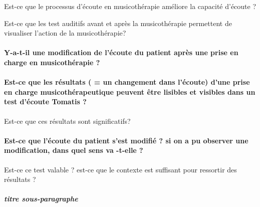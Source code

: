 Est-ce que le processus d'écoute en musicothérapie améliore la capacité
d'écoute ?

Est-ce que les test auditifs avant et après la musicothérapie permettent
de visualiser l'action de la musicothérapie?

\paragraph{Y-a-t-il une modification de l'écoute du patient après une prise
en charge en musicothérapie ?}

\paragraph{Est-ce que les résultats ( = un changement dans l'écoute) d'une prise
en charge musicothérapeutique peuvent être lisibles et visibles dans
un test d'écoute Tomatis ?}

Est-ce que ces résultats sont significatifs? 

\paragraph{Est-ce que l'écoute du patient s'est modifié ? si on a pu observer
une modification, dans quel sens va -t-elle ?}

Est-ce ce test valable ? est-ce que le contexte est suffisant pour
ressortir des résultats ?


\subparagraph{titre sous-paragraphe}



